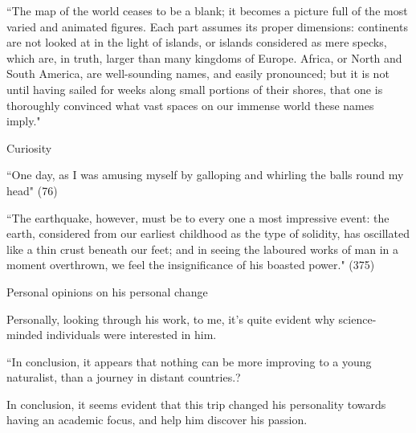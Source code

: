 \documentclass[11pt, oneside]{article}
\begin{document}
``The map of the world ceases to be a blank; it becomes a picture full of the most varied and animated figures. Each part assumes its proper dimensions: continents are not looked at in the light of islands, or islands considered as mere specks, which are, in truth, larger than many kingdoms of Europe. Africa, or North and South America, are well-sounding names, and easily pronounced; but it is not until having sailed for weeks along small portions of their shores, that one is thoroughly convinced what vast spaces on our immense world these names imply."

Curiosity 

``One day, as I was amusing myself by galloping and whirling the balls round my head" (76)

``The earthquake, however, must be to every one a most impressive event: the earth, considered from our earliest childhood as the type of solidity, has oscillated like a thin crust beneath our feet; and in seeing the laboured works of man in a moment overthrown, we feel the insignificance of his boasted power." (375)

Personal opinions on his personal change

Personally, looking through his work, to me, it's quite evident why science-minded individuals were interested in him. 

``In conclusion, it appears that nothing can be more improving to a young naturalist, than a journey in distant countries.? 

\par In conclusion, it seems evident that this trip changed his personality towards having an academic focus, and help him discover his passion. 
\end{document}
